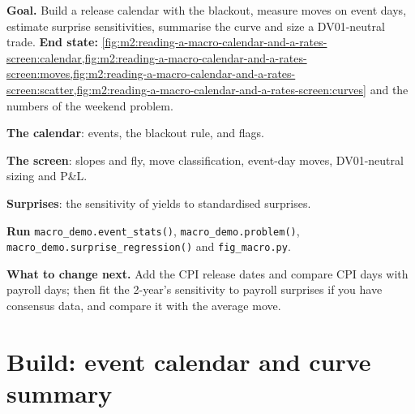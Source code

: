\begin{tutorial}
\textbf{Goal.} Build a release calendar with the blackout, measure moves on event days,
estimate surprise sensitivities, summarise the curve and size a DV01-neutral trade.
\textbf{End state:} \cref{fig:m2:reading-a-macro-calendar-and-a-rates-screen:calendar,fig:m2:reading-a-macro-calendar-and-a-rates-screen:moves,fig:m2:reading-a-macro-calendar-and-a-rates-screen:scatter,fig:m2:reading-a-macro-calendar-and-a-rates-screen:curves}
and the numbers of the weekend problem.
\begin{tutsteps}
\item \textbf{The calendar}: events, the blackout rule, and flags.
\label{lst:m2:reading-a-macro-calendar-and-a-rates-screen:cal}
\item \textbf{The screen}: slopes and fly, move classification, event-day moves,
DV01-neutral sizing and P\&L.
\label{lst:m2:reading-a-macro-calendar-and-a-rates-screen:screen}
\item \textbf{Surprises}: the sensitivity of yields to standardised surprises.
\label{lst:m2:reading-a-macro-calendar-and-a-rates-screen:sens}
\item \textbf{Run} \texttt{macro\_demo.event\_stats()}, \texttt{macro\_demo.problem()},
\texttt{macro\_demo.surprise\_regression()} and \texttt{fig\_macro.py}.
\end{tutsteps}
\textbf{What to change next.} Add the CPI release dates and compare CPI days with
payroll days; then fit the 2-year's sensitivity to payroll surprises if you have
consensus data, and compare it with the average move.
\end{tutorial}

\section{Build: event calendar and curve summary}\label{bld:m2:reading-a-macro-calendar-and-a-rates-screen:macrocal}

